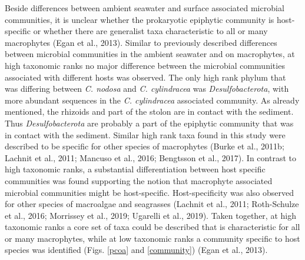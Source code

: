 \documentclass[12pt,]{article}
\begin{document}
Beside differences between ambient seawater and surface associated
microbial communities, it is unclear whether the prokaryotic epiphytic
community is host-specific or whether there are generalist taxa
characteristic to all or many macrophytes (Egan et al., 2013). Similar
to previously described differences between microbial communities in the
ambient seawater and on macrophytes, at high taxonomic ranks no major
difference between the microbial communities associated with different
hosts was observed. The only high rank phylum that was differing between
\emph{C. nodosa} and \emph{C. cylindracea} was \emph{Desulfobacterota},
with more abundant sequences in the \emph{C. cylindracea} associated
community. As already mentioned, the rhizoids and part of the stolon are
in contact with the sediment. Thus \emph{Desulfobacterota} are probably
a part of the epiphytic community that was in contact with the sediment.
Similar high rank taxa found in this study were described to be specific
for other species of macrophytes (Burke et al., 2011b; Lachnit et al.,
2011; Mancuso et al., 2016; Bengtsson et al., 2017). In contrast to high
taxonomic ranks, a substantial differentiation between host specific
communities was found supporting the notion that macrophyte associated
microbial communities might be host-specific. Host-specificity was also
observed for other species of macroalgae and seagrasses (Lachnit et al.,
2011; Roth-Schulze et al., 2016; Morrissey et al., 2019; Ugarelli et
al., 2019). Taken together, at high taxonomic ranks a core set of taxa
could be described that is characteristic for all or many macrophytes,
while at low taxonomic ranks a community specific to host species was
identified (Figs. \ref{pcoa} and \ref{community}) (Egan et al., 2013).
\end{document}
